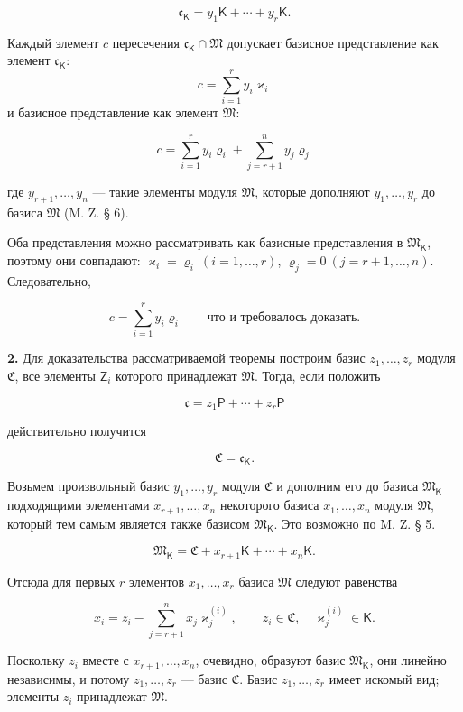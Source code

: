 \documentclass[11pt]{article}
\begin{document}
\[
\mathfrak c_{\mathsf K}=y_1\mathsf K+\cdots+y_r\mathsf K.
\]

Каждый элемент \(c\) пересечения \(\mathfrak c_{\mathsf K}\cap\mathfrak M\) допускает базисное представление как элемент \(\mathfrak c_{\mathsf K}\):
\[
c=\sum_{i=1}^{r}y_i\varkappa_i
\]
и базисное представление как элемент \(\mathfrak M\):

\[
c=\sum_{i=1}^{r}y_i\varrho_i+\sum_{j=r+1}^{n}y_j\varrho_j
\]

где \(y_{r+1},\ldots,y_n\) --- такие элементы модуля \(\mathfrak M\), которые дополняют \(y_1,\ldots,y_r\) до базиса \(\mathfrak M\) (M. Z. § 6).

Оба представления можно рассматривать как базисные представления в \(\mathfrak M_{\mathsf K}\), поэтому они совпадают: \(\varkappa_i=\varrho_i\ (i=1,\ldots,r)\), \(\varrho_j=0\ (j=r+1,\ldots,n)\). Следовательно,

\[
c=\sum_{i=1}^{r}y_i\varrho_i
\qquad\text{что и требовалось доказать.}
\]

\textbf{2.} Для доказательства рассматриваемой теоремы построим базис \(z_1,\ldots,z_r\) модуля \(\mathfrak C\), все элементы \(\mathsf{Z}_i\) которого принадлежат \(\mathfrak M\). Тогда, если положить

\[
\mathfrak c=z_1\mathsf P+\cdots+z_r\mathsf P
\]

действительно получится

\[
\mathfrak C=\mathfrak c_{\mathsf K}.
\]

Возьмем произвольный базис \(y_1,\ldots,y_r\) модуля \(\mathfrak C\) и дополним его до базиса \(\mathfrak M_{\mathsf K}\) подходящими элементами \(x_{r+1},\ldots,x_n\) некоторого базиса \(x_1,\ldots,x_n\) модуля \(\mathfrak M\), который тем самым является также базисом \(\mathfrak M_{\mathsf K}\). Это возможно по M. Z. § 5.

\[
\mathfrak M_{\mathsf K}=\mathfrak C+x_{r+1}\mathsf K+\cdots+x_n\mathsf K.
\]

Отсюда для первых \(r\) элементов \(x_1,\ldots,x_r\) базиса \(\mathfrak M\) следуют равенства

\[
x_i=z_i-\sum_{j=r+1}^{n}x_j\varkappa_j^{(i)},\qquad
z_i\in\mathfrak C,\quad \varkappa_j^{(i)}\in\mathsf K.
\]

Поскольку \(z_i\) вместе с \(x_{r+1},\ldots,x_n\), очевидно, образуют базис \(\mathfrak M_{\mathsf K}\), они линейно независимы, и потому \(z_1,\ldots,z_r\) --- базис \(\mathfrak C\). Базис \(z_1,\ldots,z_r\) имеет искомый вид; элементы \(z_i\) принадлежат \(\mathfrak M\).
\end{document}
